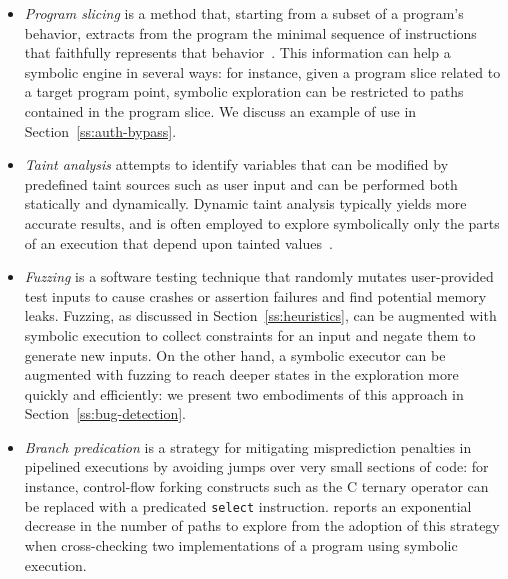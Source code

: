 \begin{itemize}
  \item {\em Program slicing} is a method that, starting from a subset of a program's behavior, extracts from the program the minimal sequence of instructions that faithfully represents that behavior~\cite{Weiser84}. This information can help a symbolic engine in several ways: for instance, given a program slice related to a target program point, symbolic exploration can be restricted to paths contained in the program slice. We discuss an example of use in Section~\ref{ss:auth-bypass}.
  \item {\em Taint analysis} %
  attempts to identify variables that can be modified by predefined taint sources such as user input and can be performed both statically and dynamically. Dynamic taint analysis typically yields more accurate results, and is often employed %
  to explore symbolically only the parts of an execution that depend upon tainted values~\cite{SAB-SP10}.
  \item {\em Fuzzing} is a software testing technique that randomly mutates user-provided test inputs to cause crashes or assertion failures and find potential memory leaks. Fuzzing, as discussed in Section~\ref{ss:heuristics}, can be augmented with symbolic execution to collect constraints for an input and negate them to generate new inputs. On the other hand, a symbolic executor can be augmented with fuzzing to reach deeper states in the exploration more quickly and efficiently: we present two embodiments of this approach in Section~\ref{ss:bug-detection}.
  \item {\em Branch predication} is a strategy for mitigating misprediction penalties in pipelined executions by avoiding jumps over very small sections of code: for instance, control-flow forking constructs such as the C ternary operator can be replaced with a predicated {\tt select} instruction. \cite{CCK-EUROSYS11} reports an exponential decrease in the number of paths to explore from the adoption of this strategy when cross-checking two implementations of a program using symbolic execution. %

\end{itemize}
